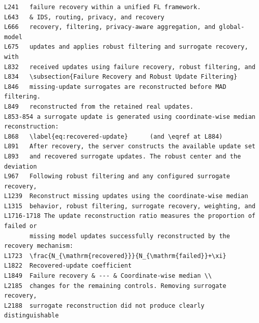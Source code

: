 \documentclass[10pt,a4paper]{article}
\begin{document}
\begin{before}
\begin{Verbatim}
L241   failure recovery within a unified FL framework.
L643   & IDS, routing, privacy, and recovery
L666   recovery, filtering, privacy-aware aggregation, and global-model
L675   updates and applies robust filtering and surrogate recovery, with
L832   received updates using failure recovery, robust filtering, and
L834   \subsection{Failure Recovery and Robust Update Filtering}
L846   missing-update surrogates are reconstructed before MAD filtering.
L849   reconstructed from the retained real updates.
L853-854 a surrogate update is generated using coordinate-wise median reconstruction:
L868   \label{eq:recovered-update}      (and \eqref at L884)
L891   After recovery, the server constructs the available update set
L893   and recovered surrogate updates. The robust center and the deviation
L967   Following robust filtering and any configured surrogate recovery,
L1239  Reconstruct missing updates using the coordinate-wise median
L1315  behavior, robust filtering, surrogate recovery, weighting, and
L1716-1718 The update reconstruction ratio measures the proportion of failed or
       missing model updates successfully reconstructed by the recovery mechanism:
L1723  \frac{N_{\mathrm{recovered}}}{N_{\mathrm{failed}}+\xi}
L1822  Recovered-update coefficient
L1849  Failure recovery & --- & Coordinate-wise median \\
L2185  changes for the remaining controls. Removing surrogate recovery,
L2188  surrogate reconstruction did not produce clearly distinguishable
\end{Verbatim}
\end{before}
\end{document}
